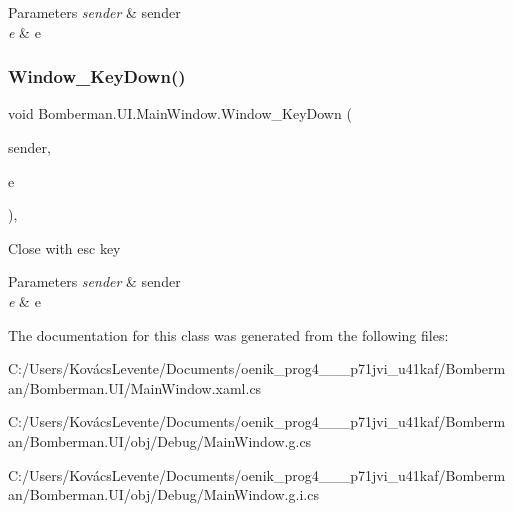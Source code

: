 \begin{DoxyParams}{Parameters}
{\em sender} & sender\\
\hline
{\em e} & e\\
\hline
\end{DoxyParams}
\mbox{\label{class_bomberman_1_1_u_i_1_1_main_window_ab27d22db9ad5bd124440639fba904369}} 
\subsubsection{\texorpdfstring{Window\_KeyDown()}{Window\_KeyDown()}}
{\footnotesize\ttfamily void Bomberman.\+U\+I.\+Main\+Window.\+Window\+\_\+\+Key\+Down (\begin{DoxyParamCaption}\item[{object}]{sender,  }\item[{Key\+Event\+Args}]{e }\end{DoxyParamCaption})\hspace{0.3cm}{\ttfamily [inline]}, {\ttfamily [private]}}



Close with esc key 


\begin{DoxyParams}{Parameters}
{\em sender} & sender\\
\hline
{\em e} & e\\
\hline
\end{DoxyParams}


The documentation for this class was generated from the following files\+:\begin{DoxyCompactItemize}
\item 
C\+:/\+Users/\+Kovács\+Levente/\+Documents/oenik\+\_\+prog4\+\_\+\_\+\_\+p71jvi\+\_\+u41kaf/\+Bomberman/\+Bomberman.\+U\+I/Main\+Window.\+xaml.\+cs\item 
C\+:/\+Users/\+Kovács\+Levente/\+Documents/oenik\+\_\+prog4\+\_\+\_\+\_\+p71jvi\+\_\+u41kaf/\+Bomberman/\+Bomberman.\+U\+I/obj/\+Debug/Main\+Window.\+g.\+cs\item 
C\+:/\+Users/\+Kovács\+Levente/\+Documents/oenik\+\_\+prog4\+\_\+\_\+\_\+p71jvi\+\_\+u41kaf/\+Bomberman/\+Bomberman.\+U\+I/obj/\+Debug/Main\+Window.\+g.\+i.\+cs\end{DoxyCompactItemize}
